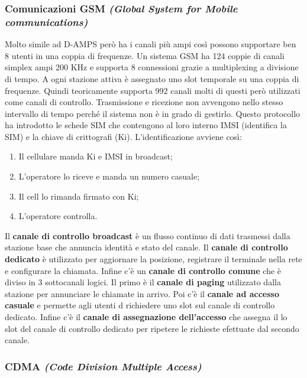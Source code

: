 \subsubsection*{Comunicazioni GSM \textit{(Global System for Mobile communications)}}

Molto simile ad D-AMPS però ha i canali più ampi così possono supportare ben 8 utenti in una coppia di frequenze. Un sistema GSM ha 124 coppie di canali simplex ampi 200 KHz e supporta 8 connessioni grazie a multiplexing a divisione di tempo. A ogni stazione attiva è assegnato uno slot temporale su una coppia di frequenze. Quindi teoricamente supporta 992 canali molti di questi però utilizzati come canali di controllo. Trasmissione e ricezione non avvengono nello stesso intervallo di tempo perché il sistema non è in grado di gestirlo. Questo protocollo ha introdotto le schede SIM che contengono al loro interno IMSI (identifica la SIM) e la chiave di crittografi (Ki). L'identificazione avviene così:

\begin{enumerate}

\item{Il cellulare manda Ki e IMSI in broadcast};
\item{L'operatore lo riceve e manda un numero casuale};
\item{Il cell lo rimanda firmato con Ki};
\item{L'operatore controlla}.

\end{enumerate}

Il \textbf{canale di controllo broadcast} è un flusso continuo di dati trasmessi dalla stazione base che annuncia identità e stato del canale. Il \textbf{canale di controllo dedicato} è utilizzato per aggiornare la posizione, registrare il terminale nella rete e configurare la chiamata. Infine c'è un \textbf{canale di controllo comune} che è diviso in 3 sottocanali logici. Il primo è il \textbf{canale di paging} utilizzato dalla stazione per annunciare le chiamate in arrivo. Poi c'è il \textbf{canale ad accesso casuale} e permette agli utenti d richiedere uno slot sul canale di controllo dedicato. Infine c'è il \textbf{canale di assegnazione dell'accesso} che assegna il lo slot del canale di controllo dedicato per ripetere le richieste efettuate dal secondo canale.

\subsubsection*{CDMA \textit{(Code Division Multiple Access)}}

